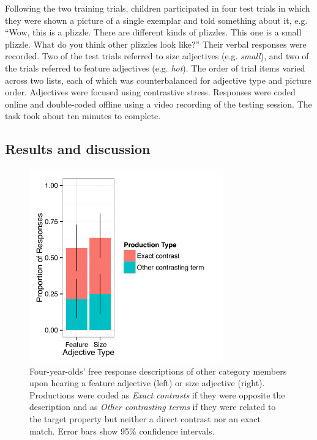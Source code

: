 \documentclass[man]{apa2}
\begin{document}
Following the two training trials, children participated in four test trials in which they were shown a picture of a single exemplar and told something about it, e.g. ``Wow, this is a plizzle. There are different kinds of plizzles. This one is a small plizzle.  What do you think other plizzles look like?'' Their verbal responses were recorded.  Two of the test trials referred to size adjectives (e.g. \emph{small}), and two of the trials referred to feature adjectives (e.g. \emph{hot}).  The order of trial items varied across two lists, each of which was counterbalanced for adjective type and picture order.  Adjectives were focused using contrastive stress. Responses were coded online and double-coded offline using a video recording of the testing session.  The task took about ten minutes to complete. 

\subsection{Results and discussion}

\begin{figure}[t] 
  \begin{center} 
    \includegraphics[width=3.3in]{figures/expt3.pdf} 
    \caption{\label{fig:freeResponse} Four-year-olds' free response descriptions of other category members upon hearing a feature adjective (left) or size adjective (right). Productions were coded as \emph{Exact contrasts} if they were opposite the description and as \emph{Other contrasting terms} if they were related to the target property but neither a direct contrast nor an exact match. Error bars show 95\% confidence intervals. }
  \end{center} 
\vspace{-10ex}
\end{figure}
\end{document}
